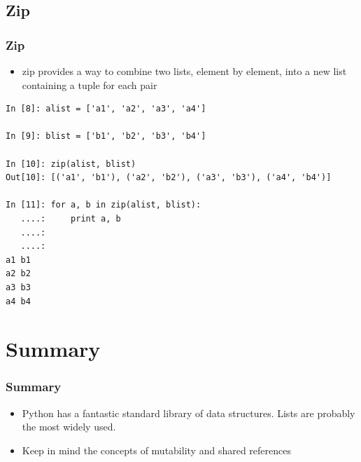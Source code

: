 \documentclass{beamer}
\begin{document}
\subsection{Zip}
\begin{frame}[fragile]
\frametitle{Zip}
\begin{itemize}
\item zip provides a way to combine two lists, element by element, into a new list containing a tuple for each pair
\end{itemize}
\begin{lstlisting}
In [8]: alist = ['a1', 'a2', 'a3', 'a4']

In [9]: blist = ['b1', 'b2', 'b3', 'b4']

In [10]: zip(alist, blist)
Out[10]: [('a1', 'b1'), ('a2', 'b2'), ('a3', 'b3'), ('a4', 'b4')]

In [11]: for a, b in zip(alist, blist):
   ....:     print a, b
   ....:
   ....:
a1 b1
a2 b2
a3 b3
a4 b4
\end{lstlisting}
\end{frame}

\section{Summary}
\begin{frame}[fragile]
\frametitle{Summary}
\begin{itemize}
   \item{Python has a fantastic standard library of data structures.  Lists are probably the most widely used.}
   \item{Keep in mind the concepts of mutability and shared references}
\end{itemize}
\end{frame}
\end{document}
